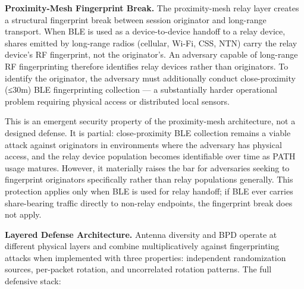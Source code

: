\documentclass[
  11pt,
]{article}
\begin{document}
\textbf{Proximity-Mesh Fingerprint Break.} The proximity-mesh relay
layer creates a structural fingerprint break between session originator
and long-range transport. When BLE is used as a device-to-device handoff
to a relay device, shares emitted by long-range radios (cellular, Wi-Fi,
CSS, NTN) carry the relay device's RF fingerprint, not the originator's.
An adversary capable of long-range RF fingerprinting therefore
identifies relay devices rather than originators. To identify the
originator, the adversary must additionally conduct close-proximity
(≤30m) BLE fingerprinting collection --- a substantially harder
operational problem requiring physical access or distributed local
sensors.

This is an emergent security property of the proximity-mesh
architecture, not a designed defense. It is partial: close-proximity BLE
collection remains a viable attack against originators in environments
where the adversary has physical access, and the relay device population
becomes identifiable over time as PATH usage matures. However, it
materially raises the bar for adversaries seeking to fingerprint
originators specifically rather than relay populations generally. This
protection applies only when BLE is used for relay handoff; if BLE ever
carries share-bearing traffic directly to non-relay endpoints, the
fingerprint break does not apply.

\textbf{Layered Defense Architecture.} Antenna diversity and BPD operate
at different physical layers and combine multiplicatively against
fingerprinting attacks when implemented with three properties:
independent randomization sources, per-packet rotation, and uncorrelated
rotation patterns. The full defensive stack:
\end{document}
